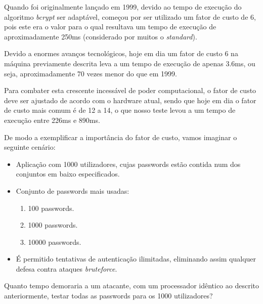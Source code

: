 Quando foi originalmente lançado em 1999, devido ao tempo de execução do algoritmo \emph{bcrypt} ser adaptável, começou por ser utilizado um fator de custo de 6, pois este era o valor para o qual resultava um tempo de execução de aproximadamente 250ms (considerado por muitos o \emph{standard}).

Devido a enormes avanços tecnológicos, hoje em dia um fator de custo 6 na máquina previamente descrita leva a um tempo de execução de apenas 3.6ms, ou seja, aproximadamente 70 vezes menor do que em 1999.

Para combater esta crescente incessável de poder computacional, o fator de custo deve ser ajustado de acordo com o hardware atual, sendo que hoje em dia o fator de custo mais comum é de 12 a 14, o que nosso teste levou a um tempo de execução entre 226ms e 890ms.

De modo a exemplificar a importância do fator de custo, vamos imaginar o seguinte cenário:

\begin{itemize}
    \item Aplicação com 1000 utilizadores, cujas passwords estão contida num dos conjuntos em baixo especificados.
    \item Conjunto de passwords mais usadas:
    \begin{enumerate}
        \item 100 passwords.
        \item 1000 passwords.
        \item 10000 passwords.
    \end{enumerate}
    \item É permitido tentativas de autenticação ilimitadas, eliminando assim qualquer defesa contra ataques \emph{bruteforce}.
\end{itemize}

Quanto tempo demoraria a um atacante, com um processador idêntico ao descrito anteriormente, testar todas as passwords para os 1000 utilizadores?

